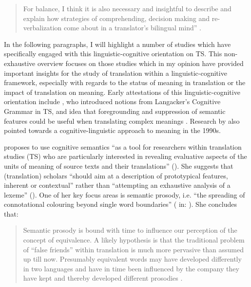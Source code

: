 \begin{quote}
For balance, I think it is also necessary and insightful to describe and explain how strategies of comprehending, decision making and re-verbalization come about in a translator’s bilingual mind” \citep[46]{house_towards_2013}. 
\end{quote}

In the following paragraphs, I will highlight a number of studies which have specifically engaged with this linguistic-cognitive orientation on TS. This non-exhaustive overview focuses on those studies which in my opinion have provided important insights for the study of translation within a linguistic-cognitive framework, especially with regards to the status of meaning in translation or the impact of translation on meaning. Early attestations of this linguistic-cognitive orientation include \citet{tabakowska_cognitive_1993}, who introduced notions from Langacker’s Cognitive Grammar in TS, and  idea that foregrounding and suppression of semantic features could be useful when translating complex meanings \citep[8]{rojo_cognitive_2013}. Research by \citet{wilss_knowledge_1996} also pointed towards a cognitive-linguistic approach to meaning in the 1990s.

\citeyear{korning_zethsen_corpus-based_2008} proposes to use cognitive semantics “as a tool for researchers within translation studies (TS) who are particularly interested in revealing evaluative aspects of the units of meaning of source texts and their translations” (\citeyear[249]{korning_zethsen_corpus-based_2008}). She suggests that (translation) scholars “should aim at a description of prototypical features, inherent or contextual” rather than “attempting an exhaustive analysis of a lexeme” (\citeyear[251]{korning_zethsen_corpus-based_2008}). One of her key focus areas is semantic prosody, i.e. “the spreading of connotational colouring beyond single word boundaries” (\citealt[68]{partington_patterns_1998} in: \citealt[256]{korning_zethsen_corpus-based_2008}). She concludes that:

\begin{quote}
Semantic prosody is bound with time to influence our perception of the concept of equivalence. A likely hypothesis is that the traditional problem of ``false friends'' within translation is much more pervasive than assumed up till now. Presumably equivalent words may have developed differently in two languages and have in time been influenced by the company they have kept and thereby developed different prosodies \citep[258]{korning_zethsen_corpus-based_2008}.
\end{quote}

